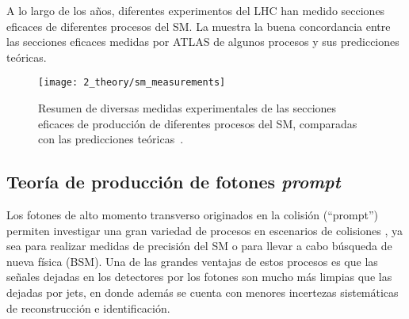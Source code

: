 A lo largo de los años, diferentes experimentos del \ac{LHC} han medido secciones eficaces de diferentes procesos del \ac{SM}. La \Fig{\ref{fig:theory:sm:hadron_interactions:sm_results}} muestra la buena concordancia entre las secciones eficaces medidas por \ac{ATLAS} de algunos procesos y sus predicciones teóricas.


\begin{figure}[ht!]
    \centering
    \texttt{[image: 2\_theory/sm\_measurements]}
    \caption{Resumen de diversas medidas experimentales de las secciones eficaces de producción de diferentes procesos del \ac{SM}, comparadas con las predicciones teóricas~\cite{ATLAS-SM_Measurements}.}
    \label{fig:theory:sm:hadron_interactions:sm_results}
\end{figure}



\subsection{Teoría de producción de fotones \textit{prompt}}
\label{subsec:theory:sm:prompt_photon}


Los fotones de alto momento transverso originados en la colisión \pp (\enquote{prompt}) permiten investigar una gran variedad de procesos en escenarios de colisiones \pp, ya sea para realizar medidas de precisión del \ac{SM} o para llevar a cabo búsqueda de nueva física (\ac{BSM}). Una de las grandes ventajas de estos procesos es que las señales dejadas en los detectores por los fotones son mucho más limpias que las dejadas por jets, en donde además se cuenta con menores incertezas sistemáticas de reconstrucción e identificación.


